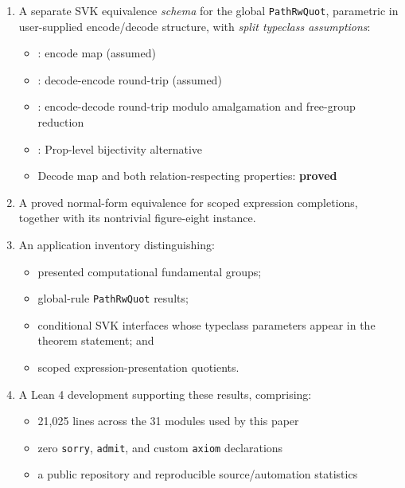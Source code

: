 \documentclass{lmcs}
\theoremstyle{definition}
\theoremstyle{plain}
\theoremstyle{remark}
\begin{document}
\begin{enumerate}
    \item A separate SVK equivalence \emph{schema} for the global
    \texttt{PathRwQuot}, parametric in user-supplied encode/decode structure,
    with \emph{split typeclass assumptions}:
    \begin{itemize}
        \item {}: encode map (assumed)
        \item {}: decode-encode round-trip (assumed)
        \item {}: encode-decode round-trip
        modulo amalgamation and free-group reduction
        \item {}: Prop-level
        bijectivity alternative
        \item Decode map and both relation-respecting properties:
        \textbf{proved}
    \end{itemize}

    \item A proved normal-form equivalence
     for scoped expression completions,
    together with its nontrivial figure-eight instance.

    \item An application inventory distinguishing:
    \begin{itemize}
        \item presented computational fundamental groups;
        \item global-rule \texttt{PathRwQuot} results;
        \item conditional SVK interfaces whose typeclass parameters appear in
        the theorem statement; and
        \item scoped expression-presentation quotients.
    \end{itemize}

    \item A Lean 4 development supporting these results, comprising:
    \begin{itemize}
        \item 21,025 lines across the 31 modules used by this paper
        \item zero \texttt{sorry}, \texttt{admit}, and custom \texttt{axiom}
        declarations
        \item a public repository and reproducible source/automation statistics
    \end{itemize}
\end{enumerate}
\end{document}
